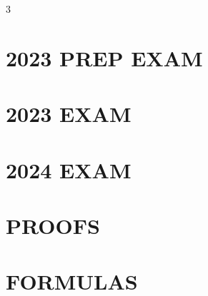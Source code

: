 \documentclass[a4paper,8pt,landscape]{article}
\begin{document}
\scriptsize
\begin{multicols*}{3}
    \section*{2023 PREP EXAM}
    
    
    
    
    
    
    

    \section*{2023 EXAM}
    
    
    

    \section*{2024 EXAM}
    
    
    
    

    \section*{PROOFS}
    
    
    

    \section*{FORMULAS}
    
    
\end{multicols*}
\end{document}
